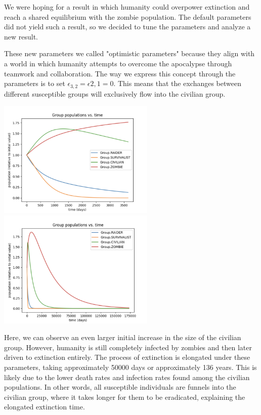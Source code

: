 \documentclass{article}
\begin{document}
We were hoping for a result in which humanity could overpower extinction and reach a shared equilibrium with the zombie population. The default parameters did not yield such a result, so we decided to tune the parameters and analyze a new result.

These new parameters we called "optimistic parameters" because they align with a world in which humanity attempts to overcome the apocalypse through teamwork and collaboration. The way we express this concept through the parameters is to set $\epsilon_{3,2} = \epsilon{2, 1} = 0$. This means that the exchanges between different susceptible groups will exclusively flow into the civilian group.

\begin{center}
    \includegraphics[width=7.5cm]{optimistic_10_year.png}
    \includegraphics[width=7.5cm]{optimistic_until_extinction.png}
\end{center}

Here, we can observe an even larger initial increase in the size of the civilian group. However, humanity is still completely infected by zombies and then later driven to extinction entirely. The process of extinction is elongated under these parameters, taking approximately 50000 days or approximately 136 years. This is likely due to the lower death rates and infection rates found among the civilian populations. In other words, all susceptible individuals are funnels into the civilian group, where it takes longer for them to be eradicated, explaining the elongated extinction time.
\end{document}
